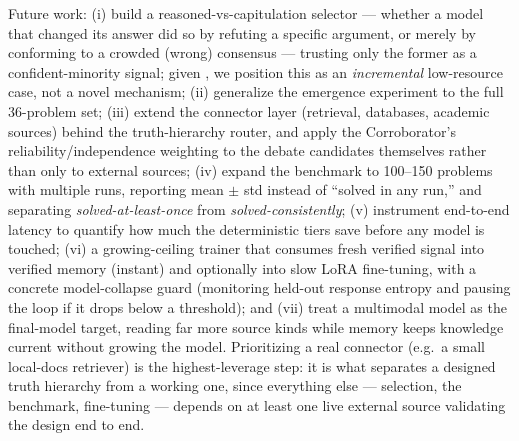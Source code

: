 \documentclass[10pt,twocolumn]{article}
\begin{document}
Future work: (i) build a reasoned-vs-capitulation selector --- whether a model
that changed its answer did so by refuting a specific argument, or merely by
conforming to a crowded (wrong) consensus --- trusting only the former as a
confident-minority signal; given \cite{flipsConformity,costConsensus,
agentsDebate,basil}, we position this as an \emph{incremental} low-resource
case, not a novel mechanism; (ii) generalize the emergence experiment to the full 36-problem set;
(iii) extend the connector layer (retrieval, databases, academic sources)
behind the truth-hierarchy router, and apply the Corroborator's
reliability/independence weighting to the debate candidates themselves rather
than only to external sources; (iv) expand the benchmark to 100--150 problems
with multiple runs, reporting mean $\pm$ std instead of ``solved in any run,''
and separating \emph{solved-at-least-once} from \emph{solved-consistently};
(v) instrument end-to-end latency to quantify how much the deterministic tiers
save before any model is touched; (vi) a growing-ceiling trainer that consumes
fresh verified signal into verified memory (instant) and optionally into slow
LoRA fine-tuning, with a concrete model-collapse guard (monitoring held-out
response entropy and pausing the loop if it drops below a threshold); and
(vii) treat a multimodal model as the final-model target, reading far more
source kinds while memory keeps knowledge current without growing the model.
Prioritizing a real connector (e.g.\ a small local-docs retriever) is the
highest-leverage step: it is what separates a designed truth hierarchy from a
working one, since everything else --- selection, the benchmark, fine-tuning ---
depends on at least one live external source validating the design end to end.
\end{document}
